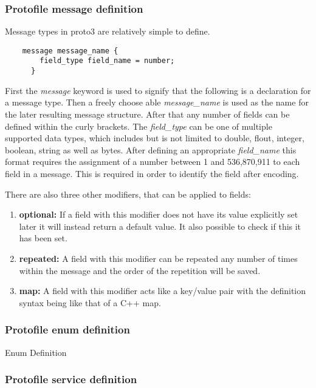 \subsubsection{Protofile message definition}

Message types in proto3 are relatively simple to define.

\begin{verbatim}
    message message_name {
        field_type field_name = number;
      }
\end{verbatim}

First the \textit{message} keyword is used to signify that the following is a declaration for a message type. Then a freely choose able \textit{message\_name} is 
used as the name for the later resulting message structure. After that any number of fields can be defined within the curly brackets. The \textit{field\_type} can be
one of multiple supported data types, which includes but is not limited to double, flout, integer, boolean, string as well as bytes. After defining an appropriate
\textit{field\_name} this format requires the assignment of a number between 1 and 536,870,911 to each field in a message. This is required in order to identify
the field after encoding.

There are also three other modifiers, that can be applied to fields:

\begin{enumerate}
    \item \textbf{optional:} If a field with this modifier does not have its value explicitly set later it will instead return a default value. It also possible to check if this it has been set.
    \item \textbf{repeated:} A field with this modifier can be repeated any number of times within the message and the order of the repetition will be saved.
    \item \textbf{map:} A field with this modifier acts like a key/value pair with the definition syntax being like that of a C++ map.
\end{enumerate}

\subsubsection{Protofile enum definition}

Enum Definition

\subsubsection{Protofile service definition}


